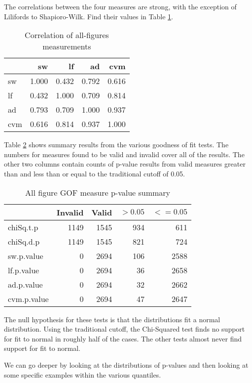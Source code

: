 The correlations between the four measures are strong, with the exception
of Lilifords to Shapioro-Wilk. Find their values in Table \ref{table:allcorr}.

\begin{table}[htbp]
  \begin{tabular}{l | r r r r}
  & sw & lf & ad & cvm \\
   \hline
  sw   & 1.000  & 0.432  & 0.792   & 0.616 \\
  lf   & 0.432  & 1.000  & 0.709   & 0.814 \\
  ad   & 0.793  & 0.709  & 1.000   & 0.937 \\
  cvm  & 0.616  & 0.814  & 0.937   & 1.000 \\
  \end{tabular}
  \caption{Correlation of all-figures measurements}
  \label{table:allcorr}
\end{table}

Table \ref{table:allsumm} shows summary results from the various goodness
of fit tests.
The numbers for measures found to be valid and invalid cover all of the
results.
The other two columns contain counts of p-value results from valid measures
greater than and less than or equal to the traditional cutoff of 0.05.

\begin{table}[htbp]
\centering
\begin{tabular}{l | r r r r}
& Invalid & Valid & $> 0.05$ & $<= 0.05$ \\
 \hline
chiSq.t.p   & 1149 & 1545 &  934 &  611 \\
chiSq.d.p   & 1149 & 1545 &  821 &  724 \\
sw.p.value  &    0 & 2694 &  106 & 2588 \\
lf.p.value  &    0 & 2694 &   36 & 2658 \\
ad.p.value  &    0 & 2694 &   32 & 2662 \\
cvm.p.value &    0 & 2694 &   47 & 2647 \\
\end{tabular}
\caption{All figure GOF measure p-value summary}
\label{table:allsumm}
\end{table}

The null hypothesis for these tests is that the distributions fit a normal
distribution. Using the traditional cutoff,
the Chi-Squared test finds no support for fit to normal in roughly half
of the cases.
The other tests almost never find support for fit to normal.

We can go deeper by looking at the distributions of p-values and then
looking at some specific examples within the various quantiles.

